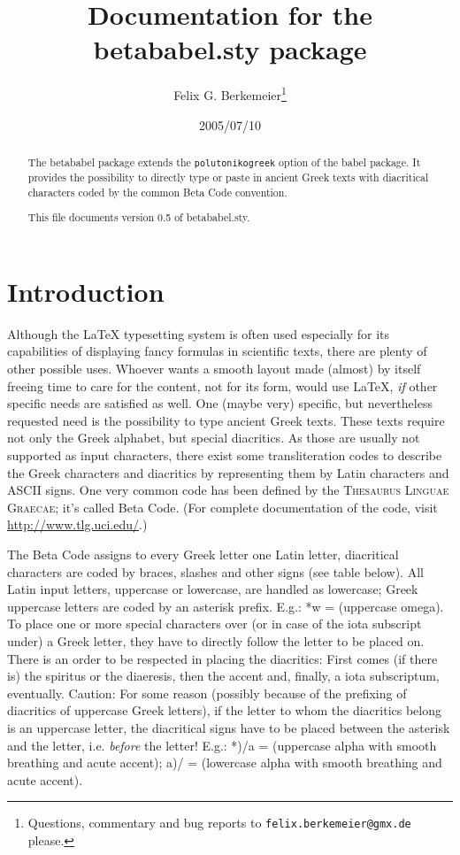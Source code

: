 \documentclass{article}
\title{Documentation for the {\sf betababel.sty} package}
\author{Felix G. Berkemeier\thanks{ Questions, commentary and bug reports to \texttt{felix.berkemeier@gmx.de} please.}}
\date{2005/07/10}
\begin{document}
\maketitle
\begin{abstract}
The \textsf{betababel} package extends the \texttt{polutonikogreek} option of the \textsf{babel} package. It provides the possibility to directly type or paste in ancient Greek texts with diacritical characters coded by the common Beta Code convention.

This file documents version 0.5 of \textsf{betababel.sty}.
\end{abstract}

\tableofcontents
\section{Introduction}
Although the \LaTeX{} typesetting system is often used especially for its capabilities of displaying fancy formulas in scientific texts, there are plenty of other possible uses. Whoever wants a smooth layout made (almost) by itself freeing time to care for the content, not for its form, would use \LaTeX, \emph{if} other specific needs are satisfied as well. One (maybe very) specific, but nevertheless requested need is the possibility to type ancient Greek texts. These texts require not only the Greek alphabet, but special diacritics. As those are usually not supported as input characters, there exist some transliteration codes to describe the Greek characters and diacritics by representing them by Latin characters and ASCII signs. One very common code has been defined by the \textsc{Thesaurus Linguae Graecae}; it's called Beta Code. (For complete documentation of the code, visit \url{http://www.tlg.uci.edu/}.)

The Beta Code assigns to every Greek letter one Latin letter, diacritical characters are coded by braces, slashes and other signs (see table below). All Latin input letters, uppercase or lowercase, are handled as lowercase; Greek uppercase letters are coded by an asterisk prefix. E.g.: *w =  (uppercase omega). To place one or more special characters over (or in case of the iota subscript under) a Greek letter, they have to directly follow the letter to be placed on. There is an order to be respected in placing the diacritics: First comes (if there is) the spiritus or the diaeresis, then the accent and, finally, a iota subscriptum, eventually. Caution: For some reason (possibly because of the prefixing of diacritics of uppercase Greek letters), if the letter to whom the diacritics belong is an uppercase letter, the diacritical signs have to be placed between the asterisk and the letter, i.e. \emph{before} the letter! E.g.: *)/a =  (uppercase alpha with smooth breathing and acute accent); a)/ =  (lowercase alpha with smooth breathing and acute accent).
\end{document}
